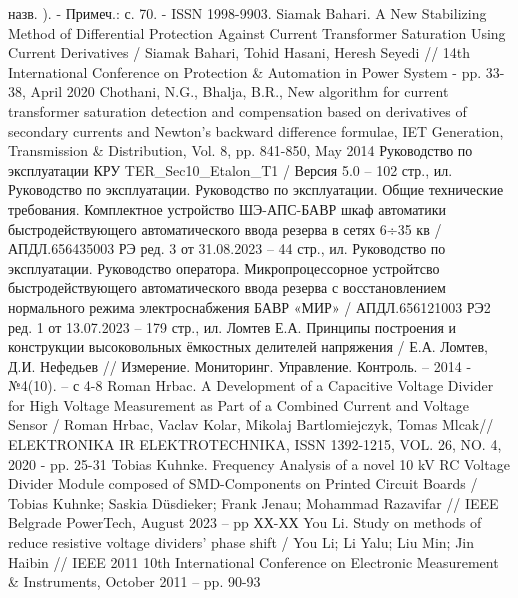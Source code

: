 назв. ). - Примеч.: с. 70. - ISSN 1998-9903.
Siamak Bahari. A New Stabilizing Method of Differential Protection Against Current
Transformer Saturation Using Current Derivatives / Siamak Bahari, Tohid Hasani, Heresh
Seyedi // 14th International Conference on Protection \& Automation in Power System - pp.
33-38, April 2020
Chothani, N.G., Bhalja, B.R., New algorithm for current transformer saturation detection
and compensation based on derivatives of secondary currents and Newton’s backward
difference formulae, IET Generation, Transmission \& Distribution, Vol. 8, pp. 841-850,
May 2014
Руководство по эксплуатации КРУ TER\_Sec10\_Etalon\_T1 / Версия 5.0 – 102 стр., ил.
Руководство по эксплуатации. Руководство по эксплуатации. Общие технические требования.
Комплектное устройство ШЭ-АПС-БАВР шкаф автоматики быстродействующего автоматического
ввода резерва в сетях 6÷35 кв / АПДЛ.656435003 РЭ ред. 3 от 31.08.2023 – 44 стр., ил.
Руководство по эксплуатации. Руководство оператора. Микропроцессорное устройтсво
быстродействующего автоматического ввода резерва с восстановлением нормального режима
электроснабжения БАВР «МИР» / АПДЛ.656121003 РЭ2 ред. 1 от 13.07.2023 – 179 стр., ил.
Ломтев Е.А. Принципы построения и конструкции высоковольных ёмкостных делителей напряжения
/ Е.А. Ломтев, Д.И. Нефедьев // Измерение. Мониторинг. Управление. Контроль. – 2014 -
№4(10). – с 4-8
Roman Hrbac. A Development of a Capacitive Voltage Divider for High Voltage Measurement as
Part of a Combined Current and Voltage Sensor / Roman Hrbac, Vaclav Kolar, Mikolaj
Bartlomiejczyk, Tomas Mlcak// ELEKTRONIKA IR ELEKTROTECHNIKA, ISSN 1392-1215, VOL. 26, NO.
4, 2020 - pp. 25-31
Tobias Kuhnke. Frequency Analysis of a novel 10 kV RC Voltage Divider Module composed of
SMD-Components on Printed Circuit Boards / Tobias Kuhnke; Saskia Düsdieker; Frank Jenau;
Mohammad Razavifar // IEEE Belgrade PowerTech, August 2023 – pp ХХ-ХХ
You Li. Study on methods of reduce resistive voltage dividers' phase shift / You Li; Li
Yalu; Liu Min; Jin Haibin // IEEE 2011 10th International Conference on Electronic
Measurement \& Instruments, October 2011 – pp. 90-93
